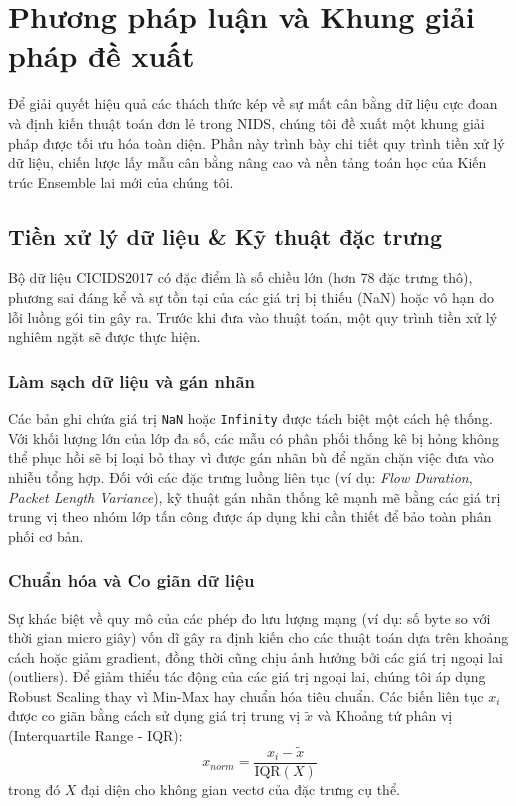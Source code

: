 \section{Phương pháp luận và Khung giải pháp đề xuất}
Để giải quyết hiệu quả các thách thức kép về sự mất cân bằng dữ liệu cực đoan và định kiến thuật toán đơn lẻ trong NIDS, chúng tôi đề xuất một khung giải pháp được tối ưu hóa toàn diện. Phần này trình bày chi tiết quy trình tiền xử lý dữ liệu, chiến lược lấy mẫu cân bằng nâng cao và nền tảng toán học của Kiến trúc Ensemble lai mới của chúng tôi.

\subsection{Tiền xử lý dữ liệu \& Kỹ thuật đặc trưng}
Bộ dữ liệu CICIDS2017 có đặc điểm là số chiều lớn (hơn 78 đặc trưng thô), phương sai đáng kể và sự tồn tại của các giá trị bị thiếu (NaN) hoặc vô hạn do lỗi luồng gói tin gây ra. Trước khi đưa vào thuật toán, một quy trình tiền xử lý nghiêm ngặt sẽ được thực hiện.

\subsubsection{Làm sạch dữ liệu và gán nhãn} 
Các bản ghi chứa giá trị \texttt{NaN} hoặc \texttt{Infinity} được tách biệt một cách hệ thống. Với khối lượng lớn của lớp đa số, các mẫu có phân phối thống kê bị hỏng không thể phục hồi sẽ bị loại bỏ thay vì được gán nhãn bù để ngăn chặn việc đưa vào nhiễu tổng hợp. Đối với các đặc trưng luồng liên tục (ví dụ: \textit{Flow Duration}, \textit{Packet Length Variance}), kỹ thuật gán nhãn thống kê mạnh mẽ bằng các giá trị trung vị theo nhóm lớp tấn công được áp dụng khi cần thiết để bảo toàn phân phối cơ bản.

\subsubsection{Chuẩn hóa và Co giãn dữ liệu} 
Sự khác biệt về quy mô của các phép đo lưu lượng mạng (ví dụ: số byte so với thời gian micro giây) vốn dĩ gây ra định kiến cho các thuật toán dựa trên khoảng cách hoặc giảm gradient, đồng thời cũng chịu ảnh hưởng bởi các giá trị ngoại lai (outliers). Để giảm thiểu tác động của các giá trị ngoại lai, chúng tôi áp dụng Robust Scaling thay vì Min-Max hay chuẩn hóa tiêu chuẩn. Các biến liên tục $x_i$ được co giãn bằng cách sử dụng giá trị trung vị $\tilde{x}$ và Khoảng tứ phân vị (Interquartile Range - IQR):
\begin{equation}
x_{norm} = \frac{x_i - \tilde{x}}{\text{IQR}(X)}
\end{equation}
trong đó $X$ đại diện cho không gian vectơ của đặc trưng cụ thể.

